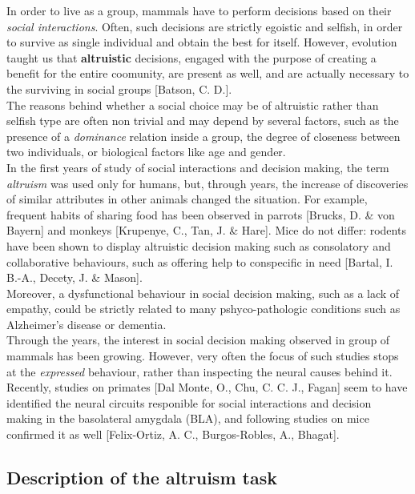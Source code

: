 \documentclass[a4paper]{article}
\begin{document}
In order to live as a group, mammals have to perform decisions based on their \textit{social interactions}. Often, such decisions are strictly egoistic and selfish, in order to survive as single individual and obtain the best for itself. However, evolution taught us that \textbf{altruistic} decisions, engaged with the purpose of creating a benefit for the entire coomunity, are present as well, and are actually necessary to the surviving in social groups [Batson, C. D.].\\
The reasons behind whether a social choice may be of altruistic rather than selfish type are often non trivial and may depend by several factors, such as the presence of a \textit{dominance} relation inside a group, the degree of closeness between two individuals, or biological factors like age and gender.\\
In the first years of study of social interactions and decision making, the term \textit{altruism} was used only for humans, but, through years, the increase of discoveries of similar attributes in other animals changed the situation. For example, frequent habits of sharing food has been observed in parrots [Brucks, D. \& von Bayern] and monkeys [Krupenye, C., Tan, J. \& Hare]. Mice do not differ: rodents have been shown to display altruistic decision making such as consolatory and collaborative behaviours, such as offering help to conspecific in need [Bartal, I. B.-A., Decety, J. \& Mason]. \\
Moreover, a dysfunctional behaviour in social decision making, such as a lack of empathy, could be strictly related to many pshyco-pathologic conditions such as Alzheimer's disease or dementia. \\
Through the years, the interest in social decision making observed in group of mammals has been growing. However, very often the focus of such studies stops at the \textit{expressed} behaviour, rather than inspecting the neural causes behind it. Recently, studies on primates [Dal Monte, O., Chu, C. C. J., Fagan] seem to have identified the neural circuits responible for social interactions and decision making in the basolateral amygdala (BLA), and following studies on mice confirmed it as well [Felix-Ortiz, A. C., Burgos-Robles, A., Bhagat].

\subsection{Description of the altruism task}
\end{document}
